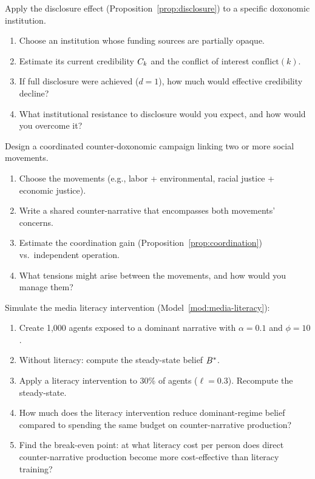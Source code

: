 \begin{exercise}
Apply the disclosure effect (Proposition~\ref{prop:disclosure}) to a specific doxonomic institution.
\begin{enumerate}[nosep]
  \item Choose an institution whose funding sources are partially opaque.
  \item Estimate its current credibility $C_{k}$ and the conflict of interest $\text{conflict}(k)$.
  \item If full disclosure were achieved ($d = 1$), how much would effective credibility decline?
  \item What institutional resistance to disclosure would you expect, and how would you overcome it?
\end{enumerate}
\end{exercise}

\begin{exercise}
Design a coordinated counter-doxonomic campaign linking two or more social movements.
\begin{enumerate}[nosep]
  \item Choose the movements (e.g., labor + environmental, racial justice + economic justice).
  \item Write a shared counter-narrative that encompasses both movements' concerns.
  \item Estimate the coordination gain (Proposition~\ref{prop:coordination}) vs.\ independent operation.
  \item What tensions might arise between the movements, and how would you manage them?
\end{enumerate}
\end{exercise}

\begin{exercise}[Computational]
Simulate the media literacy intervention (Model~\ref{mod:media-literacy}):
\begin{enumerate}[nosep]
  \item Create 1,000 agents exposed to a dominant narrative with $\alpha = 0.1$ and $\phi = 10$.
  \item Without literacy: compute the steady-state belief $B_{}^*$.
  \item Apply a literacy intervention to 30\% of agents ($\ell = 0.3$). Recompute the steady-state.
  \item How much does the literacy intervention reduce dominant-regime belief compared to spending the same budget on counter-narrative production?
  \item Find the break-even point: at what literacy cost per person does direct counter-narrative production become more cost-effective than literacy training?
\end{enumerate}
\end{exercise}
